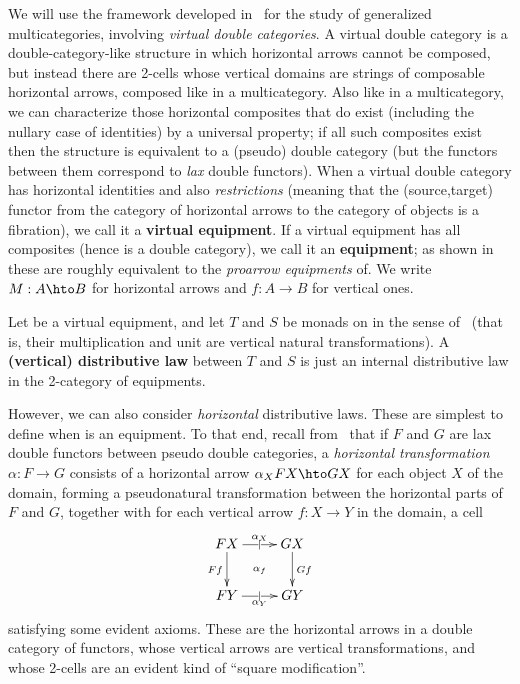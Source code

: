\documentclass{amsart}
\newcommand{\K}{\bbK}
\begin{document}
We will use the framework developed in~\cite{cs:multicats} for the study of generalized multicategories, involving \emph{virtual double categories}.
A virtual double category is a double-category-like structure in which horizontal arrows cannot be composed, but instead there are 2-cells whose vertical domains are strings of composable horizontal arrows, composed like in a multicategory.
Also like in a multicategory, we can characterize those horizontal composites that do exist (including the nullary case of identities) by a universal property; if all such composites exist then the structure is equivalent to a (pseudo) double category (but the functors between them correspond to \emph{lax} double functors).
When a virtual double category has horizontal identities and also \emph{restrictions} (meaning that the (source,target) functor from the category of horizontal arrows to the category of objects is a fibration), we call it a \textbf{virtual equipment}.
If a virtual equipment has all composites (hence is a double category), we call it an \textbf{equipment}; as shown in~\cite{shulman:frbi} these are roughly equivalent to the \emph{proarrow equipments} of\cite{wood:proarrows-i}.
We write $M:A\hto B$ for horizontal arrows and $f:A\to B$ for vertical ones.

Let \K be a virtual equipment, and let $T$ and $S$ be monads on \bbK in the sense of~\cite{cs:multicats} (that is, their multiplication and unit are vertical natural transformations).
A \textbf{(vertical) distributive law} between $T$ and $S$ is just an internal distributive law in the 2-category of equipments.

However, we can also consider \emph{horizontal} distributive laws.
These are simplest to define when \K is an equipment.
To that end, recall from~\cite{gp:something} that if $F$ and $G$ are lax double functors between pseudo double categories, a \emph{horizontal transformation} $\alpha:F\to G$ consists of a horizontal arrow $\alpha_X  F X \hto G X$ for each object $X$ of the domain, forming a pseudonatural transformation between the horizontal parts of $F$ and $G$, together with for each vertical arrow $f:X\to Y$ in the domain, a cell
\[ \xymatrix{ F X \ar[r]|-{|}^-{\alpha_X} \ar[d]_{F f} \ar@{}[dr]|{\alpha_f} & G X \ar[d]^{G f} \\
F Y \ar[r]|-{|}_-{\alpha_Y} & G Y} \]
satisfying some evident axioms.
These are the horizontal arrows in a double category of functors, whose vertical arrows are vertical transformations, and whose 2-cells are an evident kind of ``square modification''.
\end{document}

